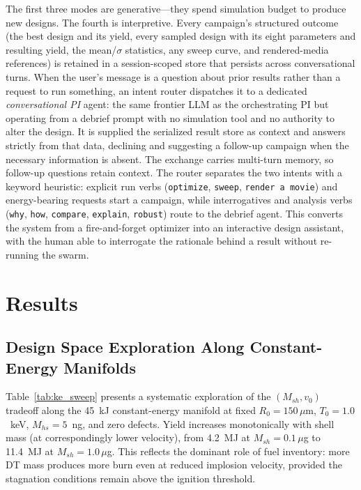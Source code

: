 \documentclass[conference]{IEEEtran}
\begin{document}
The first three modes are generative---they spend simulation budget to produce new designs.  The fourth is interpretive.  Every campaign's structured outcome (the best design and its yield, every sampled design with its eight parameters and resulting yield, the mean/$\sigma$ statistics, any sweep curve, and rendered-media references) is retained in a session-scoped store that persists across conversational turns.  When the user's message is a question about prior results rather than a request to run something, an intent router dispatches it to a dedicated \emph{conversational PI} agent: the same frontier LLM as the orchestrating PI but operating from a debrief prompt with no simulation tool and no authority to alter the design.  It is supplied the serialized result store as context and answers strictly from that data, declining and suggesting a follow-up campaign when the necessary information is absent.  The exchange carries multi-turn memory, so follow-up questions retain context.  The router separates the two intents with a keyword heuristic: explicit run verbs (\texttt{optimize}, \texttt{sweep}, \texttt{render a movie}) and energy-bearing requests start a campaign, while interrogatives and analysis verbs (\texttt{why}, \texttt{how}, \texttt{compare}, \texttt{explain}, \texttt{robust}) route to the debrief agent.  This converts the system from a fire-and-forget optimizer into an interactive design assistant, with the human able to interrogate the rationale behind a result without re-running the swarm.

\section{Results}
\label{sec:results}

\subsection{Design Space Exploration Along Constant-Energy Manifolds}

Table~\ref{tab:ke_sweep} presents a systematic exploration of the $(M_{sh}, v_0)$ tradeoff along the 45~kJ constant-energy manifold at fixed $R_0 = 150\,\mu$m, $T_0 = 1.0$~keV, $M_{hs} = 5$~ng, and zero defects.  Yield increases monotonically with shell mass (at correspondingly lower velocity), from 4.2~MJ at $M_{sh} = 0.1\,\mu$g to 11.4~MJ at $M_{sh} = 1.0\,\mu$g.  This reflects the dominant role of fuel inventory: more DT mass produces more burn even at reduced implosion velocity, provided the stagnation conditions remain above the ignition threshold.
\end{document}

